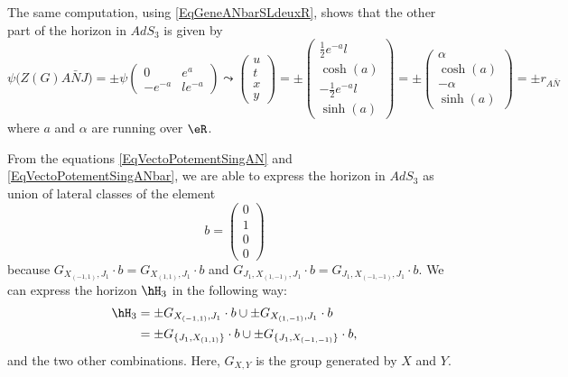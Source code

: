 	The same computation, using \eqref{EqGeneANbarSLdeuxR}, shows that the other part of the horizon in $AdS_3$ is given by
	\begin{equation}		\label{EqVectoPotementSingANbar}
		\psi\big( Z(G)A\bar NJ\big)
		=
		\pm\psi
		\begin{pmatrix}
			0        & e^a      \\
			- e^{-a} & l e^{-a}
		\end{pmatrix}
		\leadsto
		\begin{pmatrix}
			u \\
			t \\
			x \\
			y
		\end{pmatrix}=
		\pm
		\begin{pmatrix}
			\frac{1}{ 2 } e^{-a}l  \\
			\cosh(a)               \\
			-\frac{1}{ 2 } e^{-a}l \\
			\sinh(a)
		\end{pmatrix}
		=
		\pm
		\begin{pmatrix}
			\alpha   \\
			\cosh(a) \\
			-\alpha  \\
			\sinh(a)
		\end{pmatrix}
		=\pm
		r_{A\bar N}
	\end{equation}
	where $a$ and $\alpha$ are running over $\eR$.

	From the equations \eqref{EqVectoPotementSingAN} and \eqref{EqVectoPotementSingANbar}, we are able to express the horizon in $AdS_3$ as union of lateral classes of the element
	\begin{equation}
		b=\begin{pmatrix}
			0 \\
			1 \\
			0 \\
			0
		\end{pmatrix}
	\end{equation}
	because $G_{ X_{(-1,1)},J_1}\cdot b =G_{ X_{(1,1)},J_1}\cdot b$ and $G_{ J_1,X_{(1,-1)},J_1}\cdot b=G_{ J_1,X_{(-1,-1)} ,J_1}\cdot b$. We can express the horizon $\hH_3$ in the following way:
	\begin{equation}
		\begin{aligned}[]
			\hH_3 & =\pm G_{ X_{(-1,1)},J_1}\cdot b\cup \pm G_{ X_{(1,-1)},J_1}\cdot b          \\
			      & =\pm G_{ \{J_1,X_{(1,1)}\}}\cdot b\cup \pm G_{ \{J_1,X_{(-1,-1)}\}}\cdot b,
		\end{aligned}
	\end{equation}
	and the two other combinations. Here, $G_{X,Y}$ is the group generated by $X$ and $Y$.

